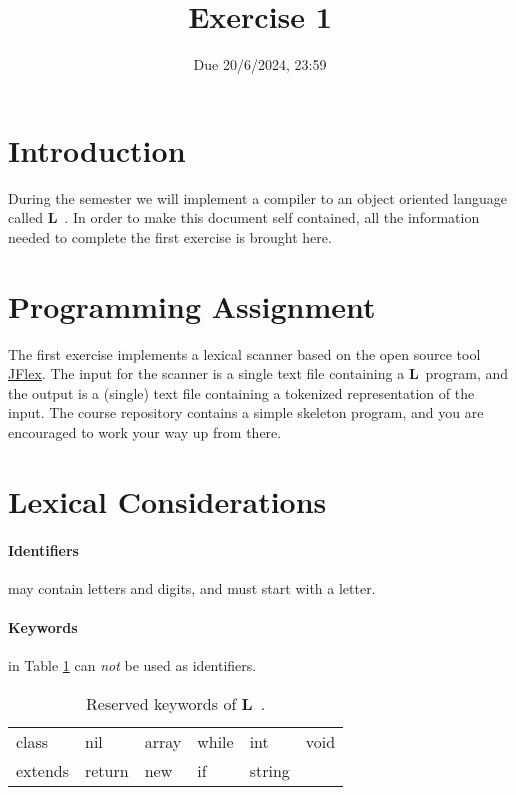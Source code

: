 \documentclass{article}
\begin{document}
\title{Exercise 1}


\date{Due 20/6/2024, 23:59}

\maketitle

\newcommand{\plname}{\textbf{L}\ }

\section{Introduction}
During the semester we will implement a compiler to an object oriented language called \plname.
In order to make this document self contained,
all the information needed to complete the first exercise is brought here.

\section{Programming Assignment}
The first exercise implements a lexical scanner based on the
open source tool \href{http://jflex.de/}{JFlex}.
The input for the scanner is a single text file containing a \plname program,
and the output is a (single) text file containing a tokenized representation of the input.
The course repository contains a simple skeleton program,
and you are encouraged to work your way up from there.

\section{Lexical Considerations}
\paragraph{Identifiers} may contain letters and digits, and must start with a letter.
\paragraph{Keywords} in Table \ref{Table_Reserved_Keywords} can \textit{not}
be used as identifiers.
\begin{table}[h]
\centering
\begin{tabular}{l l l l l l}
class & nil & array & while & int & void \\
extends & return & new & if & string & \\
\end{tabular}
\caption{
Reserved keywords of \plname.
\label{Table_Reserved_Keywords}}
\end{table}
\end{document}
